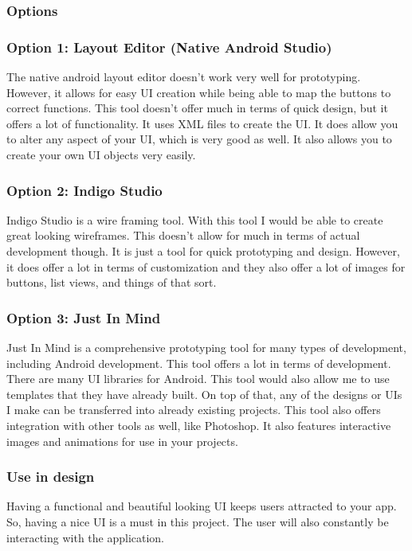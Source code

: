 \documentclass[journal,compsoc, 10pt, draftclsnofoot, onecolumn]{IEEEtran}
\begin{document}
\subsubsection{Options}
\subsubsection*{Option 1: Layout Editor (Native Android Studio)}
The native android layout editor doesn't work very well for prototyping.
However, it allows for easy UI creation while being able to map the buttons to
correct functions. This tool doesn't offer much in terms of quick design, but it
offers a lot of functionality. It uses XML files to create the UI. It does allow
you to alter any aspect of your UI, which is very good as well. It also allows
you to create your own UI objects very easily.

\subsubsection*{Option 2: Indigo Studio}
Indigo Studio is a wire framing tool. With this tool I would be able to create
great looking wireframes. This doesn't allow for much in terms of actual
development though. It is just a tool for quick prototyping and design. However, 
it does offer a lot in terms of customization and they also offer a lot of
images for buttons, list views, and things of that sort.

\subsubsection*{Option 3: Just In Mind}
Just In Mind is a comprehensive prototyping tool for many types of development,
including Android development. This tool offers a lot in terms of development.
There are many UI libraries for Android. This tool would also allow me to use
templates that they have already built. On top of that, any of the designs or
UIs I make can be transferred into already existing projects. This tool also
offers integration with other tools as well, like Photoshop. It also features
interactive images and animations for use in your projects.

\subsubsection{Use in design}
Having a functional and beautiful looking UI keeps users attracted to your app.
So, having a nice UI is a must in this project. The user will also constantly be
interacting with the application.
\end{document}
